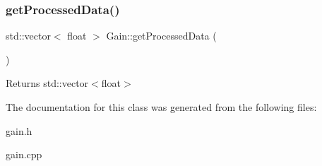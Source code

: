 \subsubsection{\texorpdfstring{get\+Processed\+Data()}{getProcessedData()}}
{\footnotesize\ttfamily std\+::vector$<$ float $>$ Gain\+::get\+Processed\+Data (\begin{DoxyParamCaption}{ }\end{DoxyParamCaption})}

\begin{DoxyReturn}{Returns}
std\+::vector$<$float$>$ 
\end{DoxyReturn}


The documentation for this class was generated from the following files\+:\begin{DoxyCompactItemize}
\item 
gain.\+h\item 
gain.\+cpp\end{DoxyCompactItemize}
